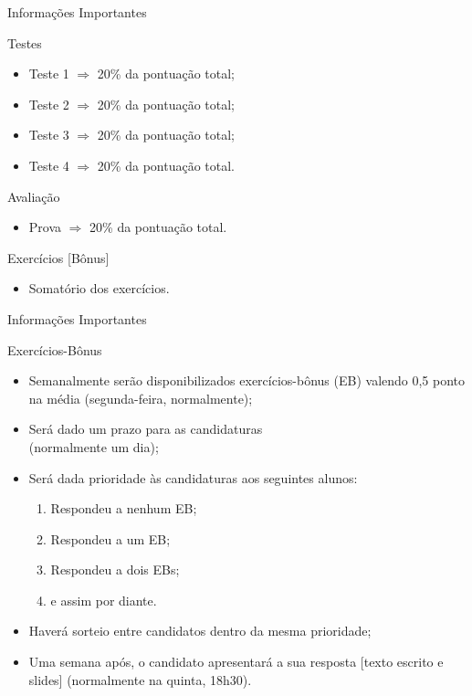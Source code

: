 \documentclass[xcolor=dvipsnames,table]{beamer}
\begin{document}
	\begin{frame}{Informações Importantes}
		\begin{block}{Testes}
			\begin{itemize}
				\item Teste 1 $\Rightarrow$ 20\% da pontuação total;
				\item Teste 2 $\Rightarrow$ 20\% da pontuação total;
				\item Teste 3 $\Rightarrow$ 20\% da pontuação total;
				\item Teste 4 $\Rightarrow$  20\% da pontuação total.
			\end{itemize}
		\end{block}
		\begin{block}{Avaliação}
			\begin{itemize}
				\item Prova $\Rightarrow$  20\% da pontuação total.
			\end{itemize}
		\end{block}
		\begin{block}{Exercícios [Bônus]}
			\begin{itemize}
				\item Somatório dos exercícios.
			\end{itemize}
		\end{block}
	\end{frame}
    
    \begin{frame}{Informações Importantes}
		\begin{block}{Exercícios-Bônus}
			\begin{itemize}
				\item Semanalmente serão disponibilizados exercícios-bônus (EB) valendo 0,5 ponto na média (segunda-feira, normalmente); \pause
                \item Será dado um prazo para as candidaturas\\
                (normalmente um dia); \pause
                \item Será dada prioridade às candidaturas aos seguintes alunos: \pause
                	\begin{enumerate}
                    	\item Respondeu a nenhum EB; \pause
                        \item Respondeu a um EB; \pause
                        \item Respondeu a dois EBs; \pause
                        \item e assim por diante.
                    \end{enumerate} \pause
                \item Haverá sorteio entre candidatos dentro da mesma prioridade; \pause
            	\item Uma semana após, o candidato apresentará a sua resposta [texto escrito e slides] (normalmente na quinta, 18h30).
			\end{itemize}
		\end{block}
	\end{frame}
	
\end{document}
